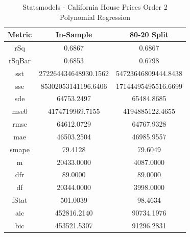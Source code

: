 \documentclass{article}
\begin{document}
\begin{table}[H]
\centering
\caption{Statsmodels - California House Prices Order 2 Polynomial Regression}
\label{tab:Statsmodels - House Prices Order 2 Polynomial Regression}
\begin{tabular}{|c|c|c|}\hline
Metric & In-Sample & 80-20 Split \\ \hline \hline
rSq & 0.6867 & 0.6867 \\ \hline
rSqBar & 0.6853 & 0.6798 \\ \hline
sst & 272264434648930.1562 & 54723646809444.8438 \\ \hline
sse & 85302053141196.6406 & 17144495495516.6699 \\ \hline
sde & 64753.2497 & 65484.8685 \\ \hline
mse0 & 4174719969.7155 & 4194885122.4655 \\ \hline
rmse & 64612.0729 & 64767.9328 \\ \hline
mae & 46503.2504 & 46985.9557 \\ \hline
smape & 79.4128 & 79.6049 \\ \hline
m & 20433.0000 & 4087.0000 \\ \hline
dfr & 89.0000 & 89.0000 \\ \hline
df & 20344.0000 & 3998.0000 \\ \hline
fStat & 501.0039 & 98.4634 \\ \hline
aic & 452816.2140 & 90734.1976 \\ \hline
bic & 453521.5307 & 91296.2831 \\ \hline
\end{tabular}
\end{table}
\end{document}
